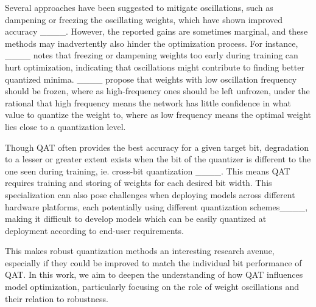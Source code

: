 Several approaches have been suggested to mitigate oscillations, such as dampening or freezing the oscillating weights, which have shown improved accuracy ____. However, the reported gains are sometimes marginal, and these methods may inadvertently also hinder the optimization process. For instance, ____ notes that freezing or dampening weights too early during training can hurt optimization, indicating that oscillations might contribute to finding better quantized minima. ____ propose that weights with low oscillation frequency should be frozen, where as high-frequency ones should be left unfrozen, under the rational that high frequency means the network has little confidence in what value to quantize the weight to, where as low frequency means the optimal weight lies close to a quantization level.

Though QAT often provides the best accuracy for a given target bit, degradation to a lesser or greater extent exists when the bit of the quantizer is different to the one seen during training, ie. cross-bit quantization ____. This means QAT requires training and storing of weights for each desired bit width. This specialization can also pose challenges when deploying models across different hardware platforms, each potentially using different quantization schemes____, making it difficult to develop models which can be easily quantized at deployment according to end-user requirements.

This makes robust quantization methods an interesting research avenue, especially if they could be improved to match the individual bit performance of QAT. In this work, we aim to deepen the understanding of how QAT influences model optimization, particularly focusing on the role of weight oscillations and their relation to robustness.